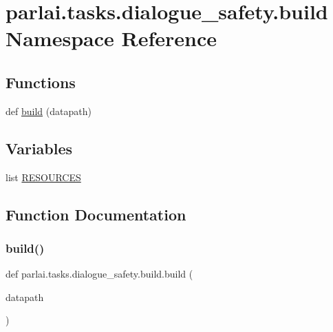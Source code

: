 \hypertarget{namespaceparlai_1_1tasks_1_1dialogue__safety_1_1build}{}\section{parlai.\+tasks.\+dialogue\+\_\+safety.\+build Namespace Reference}
\label{namespaceparlai_1_1tasks_1_1dialogue__safety_1_1build}
\subsection*{Functions}
\begin{DoxyCompactItemize}
\item 
def \hyperlink{namespaceparlai_1_1tasks_1_1dialogue__safety_1_1build_a455bdcaa83ad5436bff9da4dcf869412}{build} (datapath)
\end{DoxyCompactItemize}
\subsection*{Variables}
\begin{DoxyCompactItemize}
\item 
list \hyperlink{namespaceparlai_1_1tasks_1_1dialogue__safety_1_1build_aff46ce1360a346f2f6fcb9d9a8cec433}{R\+E\+S\+O\+U\+R\+C\+ES}
\end{DoxyCompactItemize}


\subsection{Function Documentation}
\mbox{\label{namespaceparlai_1_1tasks_1_1dialogue__safety_1_1build_a455bdcaa83ad5436bff9da4dcf869412}} 
\subsubsection{\texorpdfstring{build()}{build()}}
{\footnotesize\ttfamily def parlai.\+tasks.\+dialogue\+\_\+safety.\+build.\+build (\begin{DoxyParamCaption}\item[{}]{datapath }\end{DoxyParamCaption})}



